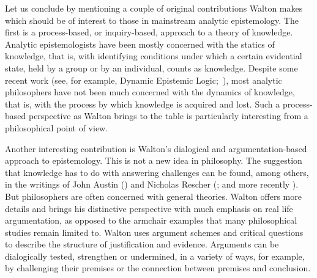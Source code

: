 \documentclass[12pt,a4paper]{article}
\begin{document}

Let us conclude by mentioning 
a couple of original contributions Walton makes 
which should be of interest to those 
in mainstream analytic epistemology. The first is a process-based, or
inquiry-based, approach to a theory of knowledge. Analytic
epistemologists have been mostly concerned with the statics of knowledge, 
that is, with identifying conditions under which a certain
evidential state, held by a group or by an individual, counts as
knowledge. Despite some recent work (see, for example, 
Dynamic Epistemic Logic;~\citealp{baltagRenne2016}), most analytic philosophers have not
been much concerned with the dynamics of knowledge, that is, with
the process by which knowledge is acquired and lost. Such a process-based
perspective as Walton brings to the table is particularly interesting
from a philosophical point of view. 

Another interesting contribution is Walton's dialogical and argumentation-based 
approach to epistemology. This is not a new idea in philosophy. The suggestion 
that knowledge has to do with answering challenges can be found, among others,
in the writings of John Austin (\citeyear{austin1962}) and Nicholas Rescher (\citeyear{rescher1977}; and more recently \citeyear{rescher2003,rescher2005}). 
But philosophers are often concerned with general 
theories. Walton offers more details and 
brings his distinctive perspective with much emphasis on real life argumentation, as opposed to the armchair examples that many philosophical studies remain limited to.
Walton uses argument schemes and critical questions
to describe the structure of justification and evidence. 
Arguments can be dialogically tested, strengthen or undermined, 
in a variety of ways, for example, by challenging their premises 
or the connection between premises and conclusion.  
\end{document}
